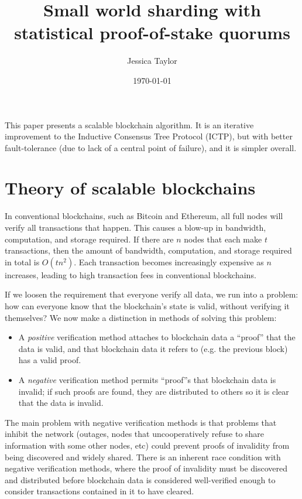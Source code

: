 \documentclass{article}
\title{Small world sharding with statistical proof-of-stake quorums}
\date{\today}
\author{Jessica Taylor}
\begin{document}
\maketitle

This paper presents a scalable blockchain algorithm.  It is an iterative improvement to the Inductive Consensus Tree Protocol (ICTP), but with better fault-tolerance (due to lack of a central point of failure), and it is simpler overall.

\section{Theory of scalable blockchains}

In conventional blockchains, such as Bitcoin and Ethereum, all full nodes will verify all transactions that happen.  This causes a blow-up in bandwidth, computation, and storage required.
If there are $n$ nodes that each make $t$ transactions, then the amount of bandwidth, computation, and storage required in total is $O(tn^2)$.  Each transaction becomes increasingly expensive
as $n$ increases, leading to high transaction fees in conventional blockchains.

If we loosen the requirement that everyone verify all data, we run into a problem: how can everyone know that the blockchain's state is valid, without verifying it themselves?
We now make a distinction in methods of solving this problem:

\begin{itemize}
  \item A \emph{positive} verification method attaches to blockchain data a ``proof'' that the data is valid, and that blockchain data it refers to (e.g. the previous block) has a valid proof.
  \item A \emph{negative} verification method permits ``proof''s that blockchain data is invalid; if such proofs are found, they are distributed to others so it is clear that the data is invalid.
\end{itemize}

The main problem with negative verification methods is that problems that inhibit the network (outages, nodes that uncooperatively refuse to share information with some other nodes, etc)
could prevent proofs of invalidity from being discovered and widely shared.  There is an inherent race condition with negative verification methods, where the proof of invalidity must be
discovered and distributed before blockchain data is considered well-verified enough to consider transactions contained in it to have cleared.
\end{document}
